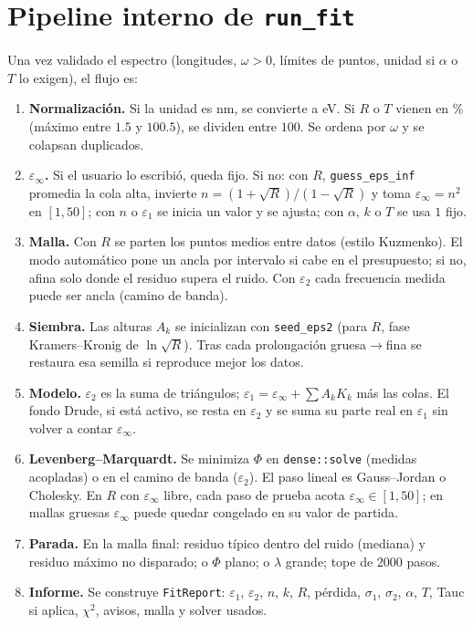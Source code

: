\section{Pipeline interno de \texttt{run\_fit}}

Una vez validado el espectro (longitudes, $\omega>0$, l\'imites de puntos, unidad si $\alpha$ o $T$ lo exigen), el flujo es:

\begin{enumerate}[leftmargin=*]
\item \textbf{Normalizaci\'on.} Si la unidad es nm, se convierte a eV. Si $R$ o $T$ vienen en \% (m\'aximo entre $1.5$ y $100.5$), se dividen entre $100$. Se ordena por $\omega$ y se colapsan duplicados.
\item \textbf{$\varepsilon_\infty$.} Si el usuario lo escribi\'o, queda fijo. Si no: con $R$, \texttt{guess\_eps\_inf} promedia la cola alta, invierte $n=(1+\sqrt{R})/(1-\sqrt{R})$ y toma $\varepsilon_\infty=n^{2}$ en $[1,50]$; con $n$ o $\varepsilon_1$ se inicia un valor y se ajusta; con $\alpha$, $k$ o $T$ se usa $1$ fijo.
\item \textbf{Malla.} Con $R$ se parten los puntos medios entre datos (estilo Kuzmenko). El modo autom\'atico pone un ancla por intervalo si cabe en el presupuesto; si no, afina solo donde el residuo supera el ruido. Con $\varepsilon_2$ cada frecuencia medida puede ser ancla (camino de banda).
\item \textbf{Siembra.} Las alturas $A_k$ se inicializan con \texttt{seed\_eps2} (para $R$, fase Kramers--Kronig de $\ln\sqrt{R}$). Tras cada prolongaci\'on gruesa$\to$fina se restaura esa semilla si reproduce mejor los datos.
\item \textbf{Modelo.} $\varepsilon_2$ es la suma de tri\'angulos; $\varepsilon_1=\varepsilon_\infty+\sum A_k K_k$ m\'as las colas. El fondo Drude, si est\'a activo, se resta en $\varepsilon_2$ y se suma su parte real en $\varepsilon_1$ sin volver a contar $\varepsilon_\infty$.
\item \textbf{Levenberg--Marquardt.} Se minimiza $\Phi$ en \texttt{dense::solve} (medidas acopladas) o en el camino de banda ($\varepsilon_2$). El paso lineal es Gauss--Jordan o Cholesky. En $R$ con $\varepsilon_\infty$ libre, cada paso de prueba acota $\varepsilon_\infty\in[1,50]$; en mallas gruesas $\varepsilon_\infty$ puede quedar congelado en su valor de partida.
\item \textbf{Parada.} En la malla final: residuo t\'ipico dentro del ruido (mediana) y residuo m\'aximo no disparado; o $\Phi$ plano; o $\lambda$ grande; tope de $2000$ pasos.
\item \textbf{Informe.} Se construye \texttt{FitReport}: $\varepsilon_1$, $\varepsilon_2$, $n$, $k$, $R$, p\'erdida, $\sigma_1$, $\sigma_2$, $\alpha$, $T$, Tauc si aplica, $\chi^{2}$, avisos, malla y solver usados.
\end{enumerate}

